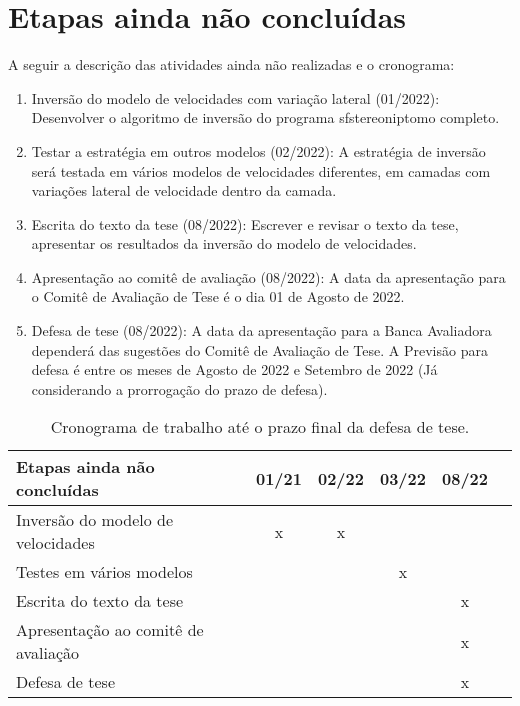 \section{Etapas ainda não concluídas}

A seguir a descrição das atividades ainda não realizadas e o cronograma:

  \begin{enumerate}
    \item Inversão do modelo de velocidades com variação lateral (01/2022): Desenvolver o algoritmo de
    inversão do programa sfstereoniptomo completo.
    \item Testar a estratégia em outros modelos (02/2022): A estratégia de inversão será testada em 
    vários modelos de velocidades diferentes, em camadas com variações lateral de velocidade dentro da
    camada.
    \item  Escrita do texto da tese (08/2022): Escrever e revisar o texto da tese, apresentar os resultados da
    inversão do modelo de velocidades.
     \item Apresentação ao comitê de avaliação (08/2022): A data da apresentação para o Comitê de Avaliação de Tese é o dia 01 de Agosto de 2022.
    \item  Defesa de tese (08/2022): A data da apresentação para a Banca Avaliadora dependerá das sugestões do
    Comitê de Avaliação de Tese. A Previsão para defesa é entre os meses de Agosto de
    2022 e Setembro de 2022 (Já considerando a prorrogação do prazo de defesa).
  \end{enumerate}
  
   \begin{table}[H]
      \caption{Cronograma de trabalho até o prazo final da defesa de tese.}
      \centering
      
      \begin{tabular}{|p{6cm}|c|c|c|c|c|}

      \hline
      \textbf{Etapas ainda não concluídas} & 01/21 & 02/22 & 03/22 & 08/22 \\ \hline
      Inversão do modelo de velocidades & x & x & & \\ \hline
      Testes em vários modelos & & & x & \\ \hline
      Escrita do texto da tese & & & & x \\ \hline
      Apresentação ao comitê de avaliação & & & & x \\ \hline
      Defesa de tese & & & & x \\
      \hline
      
      \end{tabular}
  \end{table}
  
